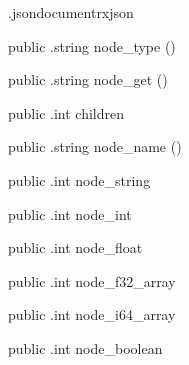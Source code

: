 \begin{CrexxClass}{.jsondocument}{rxjson}
\begin{Members}
    \Method
      {public}
      {.string}
      {node\_type}
      {()}

    \Method
      {public}
      {.string}
      {node\_get}
      {()}

    \Method
      {public}
      {.int}
      {children}
      {}

    \Method
      {public}
      {.string}
      {node\_name}
      {()}

    \Method
      {public}
      {.int}
      {node\_string}
      {}

    \Method
      {public}
      {.int}
      {node\_int}
      {}

    \Method
      {public}
      {.int}
      {node\_float}
      {}

    \Method
      {public}
      {.int}
      {node\_f32\_array}
      {}

    \Method
      {public}
      {.int}
      {node\_i64\_array}
      {}

    \Method
      {public}
      {.int}
      {node\_boolean}
      {}

  \end{Members}
\end{CrexxClass}

